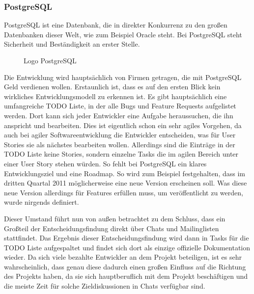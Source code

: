 \subsubsection{PostgreSQL}
PostgreSQL ist eine Datenbank, die in direkter Konkurrenz zu den großen Datenbanken dieser Welt, wie zum Beispiel Oracle steht\cite{bib:pg-oracle}. Bei PostgreSQL steht Sicherheit und Beständigkeit an erster Stelle.
\begin{figure}[h]
	\centering
	\caption{Logo PostgreSQL\cite{bib:pg-logo}}
	\label{pgLogo}
\end{figure}
Die Entwicklung wird hauptsächlich von Firmen getragen, die mit Post\-gre\-SQL Geld verdienen wollen\cite{bib:pg-contrib}. Erstaunlich ist, dass es auf den ersten Blick kein wirkliches Entwicklungsmodell zu erkennen ist. Es gibt hauptsächlich eine umfangreiche TODO Liste, in der alle Bugs und Feature Requests aufgelistet werden\cite{bib:pg-todo}. Dort kann sich jeder Entwickler eine Aufgabe heraussuchen, die ihn anspricht und bearbeiten. Dies ist eigentlich schon ein sehr agiles Vorgehen, da auch bei agiler Softwareentwicklung die Entwickler entscheiden, was für User Stories sie als nächstes bearbeiten wollen. Allerdings sind die Einträge in der TODO Liste keine Stories, sondern einzelne Tasks die im agilen Bereich unter einer User Story stehen würden. So fehlt bei PostgreSQL ein klares Entwicklungsziel und eine Roadmap. So wird zum Beispiel festgehalten, dass im dritten Quartal 2011 möglicherweise eine neue Version erscheinen soll. Was diese neue Version allerdings für Features erfüllen muss, um veröffentlicht zu werden, wurde nirgends definiert\cite{bib:pg-roadmap}.

Dieser Umstand führt nun von außen betrachtet zu dem Schluss, dass ein Großteil der Entscheidungsfindung direkt über Chats und Mailinglisten stattfindet. Das Ergebnis dieser Entscheidungsfindung wird dann in Tasks für die TODO Liste aufgespaltet und findet sich dort als einzige offizielle Dokumentation wieder. Da sich viele bezahlte Entwickler an dem Projekt beteiligen, ist es sehr wahrscheinlich, dass genau diese dadurch einen großen Einfluss auf die Richtung des Projekts haben, da sie sich hauptberuflich mit dem Projekt beschäftigen und die meiste Zeit für solche Zieldiskussionen in Chats verfügbar sind.

